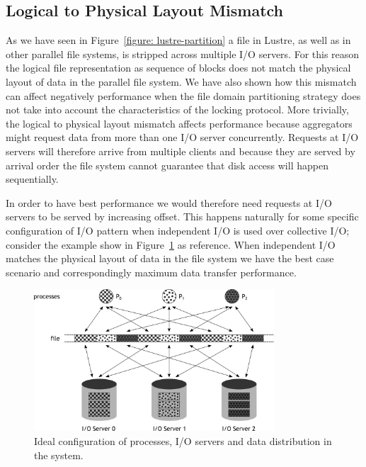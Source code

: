 \subsection{Logical to Physical Layout Mismatch}
As we have seen in Figure~\ref{figure: lustre-partition} a file in Lustre, as well as in other parallel file systems, is stripped across multiple I/O servers. For this reason the logical file representation
as sequence of blocks does not match the physical layout of data in the parallel file system. We have also shown how this mismatch can affect negatively performance when the file domain partitioning 
strategy does not take into account the characteristics of the locking protocol. More trivially, the logical to physical layout mismatch affects performance because aggregators might request data from more
than one I/O server concurrently. Requests at I/O servers will therefore arrive from multiple clients and because they are served by arrival order the file system cannot guarantee that disk access will
happen sequentially.

In order to have best performance we would therefore need requests at I/O servers to be served by increasing offset. This happens naturally for some specific configuration of I/O pattern when independent
I/O is used over collective I/O; consider the example show in Figure~\ref{figure: resonant-io} as reference. When independent I/O matches the physical layout of data in the file system we have the best
case scenario and correspondingly maximum data transfer performance.

\begin{figure}[!htb]
  \centering
  \includegraphics[width=0.8\textwidth]{figures/resonant-io}
  \caption{Ideal configuration of processes, I/O servers and data distribution in the system.}
  \label{figure: resonant-io}
\end{figure}

